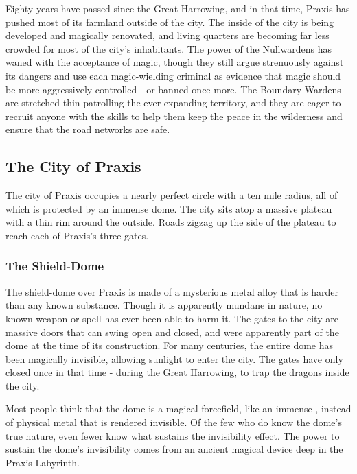       Eighty years have passed since the Great Harrowing, and in that time, Praxis has pushed most of its farmland outside of the city.
      The inside of the city is being developed and magically renovated, and living quarters are becoming far less crowded for most of the city's inhabitants.
      The power of the Nullwardens has waned with the acceptance of magic, though they still argue strenuously against its dangers and use each magic-wielding criminal as evidence that magic should be more aggressively controlled - or banned once more.
      The Boundary Wardens are stretched thin patrolling the ever expanding territory, and they are eager to recruit anyone with the skills to help them keep the peace in the wilderness and ensure that the road networks are safe.

  \subsection{The City of Praxis}
    The city of Praxis occupies a nearly perfect circle with a ten mile radius, all of which is protected by an immense dome.
    The city sits atop a massive plateau with a thin rim around the outside.
    Roads zigzag up the side of the plateau to reach each of Praxis's three gates.

    \subsubsection{The Shield-Dome}
      The shield-dome over Praxis is made of a mysterious metal alloy that is harder than any known substance.
      Though it is apparently mundane in nature, no known weapon or spell has ever been able to harm it.
      The gates to the city are massive doors that can swing open and closed, and were apparently part of the dome at the time of its construction.
      For many centuries, the entire dome has been magically invisible, allowing sunlight to enter the city.
      The gates have only closed once in that time - during the Great Harrowing, to trap the dragons inside the city.

      Most people think that the dome is a magical forcefield, like an immense , instead of physical metal that is rendered invisible.
      Of the few who do know the dome's true nature, even fewer know what sustains the invisibility effect.
      The power to sustain the dome's invisibility comes from an ancient magical device deep in the Praxis Labyrinth.

